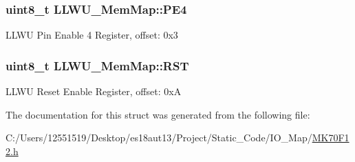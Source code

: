 \subsubsection[{P\+E4}]{\setlength{\rightskip}{0pt plus 5cm}uint8\+\_\+t L\+L\+W\+U\+\_\+\+Mem\+Map\+::\+P\+E4}\label{struct_l_l_w_u___mem_map_a61ec3534039e161c5c71ea7f290f23d5}
L\+L\+W\+U Pin Enable 4 Register, offset\+: 0x3 \hypertarget{struct_l_l_w_u___mem_map_a95c7e36f114e8ac7f235ad8ef335f1cf}{}
\subsubsection[{R\+S\+T}]{\setlength{\rightskip}{0pt plus 5cm}uint8\+\_\+t L\+L\+W\+U\+\_\+\+Mem\+Map\+::\+R\+S\+T}\label{struct_l_l_w_u___mem_map_a95c7e36f114e8ac7f235ad8ef335f1cf}
L\+L\+W\+U Reset Enable Register, offset\+: 0x\+A 

The documentation for this struct was generated from the following file\+:\begin{DoxyCompactItemize}
\item 
C\+:/\+Users/12551519/\+Desktop/es18aut13/\+Project/\+Static\+\_\+\+Code/\+I\+O\+\_\+\+Map/\hyperlink{_m_k70_f12_8h}{M\+K70\+F12.\+h}\end{DoxyCompactItemize}
